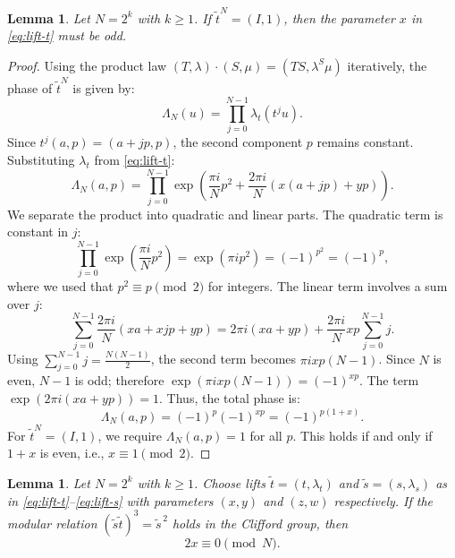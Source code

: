 \documentclass[11pt, reqno]{amsart}
\newtheorem{lemma}[theorem]{Lemma}
\theoremstyle{definition}
\theoremstyle{remark}
\begin{document}
\begin{lemma}\label{lem:parity-constraint}
Let $N=2^k$ with $k \geq 1$. If $\tilde{t}^N = (I, 1)$, then the parameter $x$ in \eqref{eq:lift-t} must be odd.
\end{lemma}

\begin{proof}
Using the product law $(T, \lambda) \cdot (S, \mu) = (TS, \lambda^S \mu)$ iteratively, the phase of $\tilde{t}^N$ is given by:
\begin{equation}
\Lambda_N(u) = \prod_{j=0}^{N-1} \lambda_t(t^j u).
\end{equation}
Since $t^j(a, p) = (a + jp, p)$, the second component $p$ remains constant. Substituting $\lambda_t$ from \eqref{eq:lift-t}:
\begin{equation}
\Lambda_N(a, p) = \prod_{j=0}^{N-1} \exp\!\left(\frac{\pi i}{N} p^2 + \frac{2\pi i}{N}(x(a+jp) + yp)\right).
\end{equation}
We separate the product into quadratic and linear parts. The quadratic term is constant in $j$:
\[
\prod_{j=0}^{N-1} \exp\!\left(\frac{\pi i}{N} p^2\right) = \exp(\pi i p^2) = (-1)^{p^2} = (-1)^p,
\]
where we used that $p^2 \equiv p \pmod 2$ for integers. The linear term involves a sum over $j$:
\[
\sum_{j=0}^{N-1} \frac{2\pi i}{N}(xa + xjp + yp) = 2\pi i (xa + yp) + \frac{2\pi i}{N} xp \sum_{j=0}^{N-1} j.
\]
Using $\sum_{j=0}^{N-1} j = \frac{N(N-1)}{2}$, the second term becomes $\pi i xp (N-1)$. Since $N$ is even, $N-1$ is odd; therefore $\exp(\pi i xp(N-1)) = (-1)^{xp}$. The term $\exp(2\pi i (xa+yp)) = 1$.
Thus, the total phase is:
\begin{equation}
\Lambda_N(a, p) = (-1)^p (-1)^{xp} = (-1)^{p(1+x)}.
\end{equation}
For $\tilde{t}^N = (I, 1)$, we require $\Lambda_N(a, p) = 1$ for all $p$. This holds if and only if $1+x$ is even, i.e., $x \equiv 1 \pmod 2$.
\end{proof}


\begin{lemma}\label{lem:modular-constraint}
Let $N=2^k$ with $k \geq 1$. Choose lifts $\tilde t=(t,\lambda_t)$ and $\tilde s=(s,\lambda_s)$ as in \eqref{eq:lift-t}--\eqref{eq:lift-s} with parameters $(x,y)$ and $(z,w)$ respectively.
If the modular relation $(\tilde s\tilde t)^3=\tilde s^{\,2}$ holds in the Clifford group, then
\[
2x\equiv 0\pmod N.
\]
\end{lemma}
\end{document}
